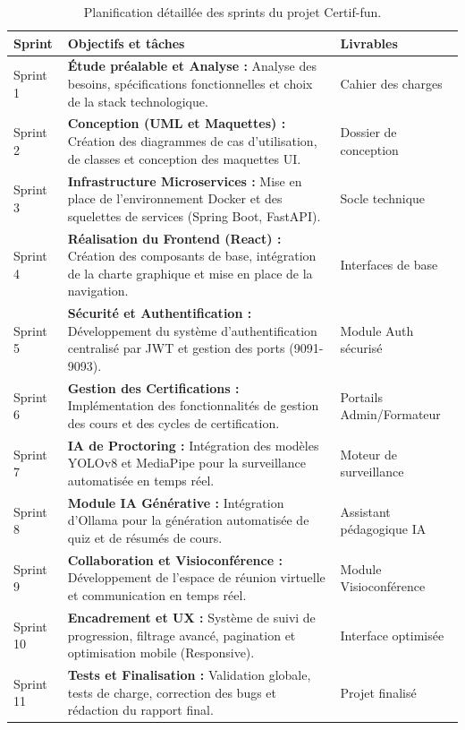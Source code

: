 \begin{table}[H]
\centering
\caption{Planification détaillée des sprints du projet Certif-fun.}
\label{table:sprints}
\begin{tabular}{|l|p{8cm}|l|}
\hline
\textbf{Sprint} & \textbf{Objectifs et tâches} & \textbf{Livrables} \\ \hline
Sprint 1 & \textbf{Étude préalable et Analyse :} Analyse des besoins, spécifications fonctionnelles et choix de la stack technologique. & Cahier des charges \\ \hline
Sprint 2 & \textbf{Conception (UML et Maquettes) :} Création des diagrammes de cas d'utilisation, de classes et conception des maquettes UI. & Dossier de conception \\ \hline
Sprint 3 & \textbf{Infrastructure Microservices :} Mise en place de l'environnement Docker et des squelettes de services (Spring Boot, FastAPI). & Socle technique \\ \hline
Sprint 4 & \textbf{Réalisation du Frontend (React) :} Création des composants de base, intégration de la charte graphique et mise en place de la navigation. & Interfaces de base \\ \hline
Sprint 5 & \textbf{Sécurité et Authentification :} Développement du système d'authentification centralisé par JWT et gestion des ports (9091-9093). & Module Auth sécurisé \\ \hline
Sprint 6 & \textbf{Gestion des Certifications :} Implémentation des fonctionnalités de gestion des cours et des cycles de certification. & Portails Admin/Formateur \\ \hline
Sprint 7 & \textbf{IA de Proctoring :} Intégration des modèles YOLOv8 et MediaPipe pour la surveillance automatisée en temps réel. & Moteur de surveillance \\ \hline
Sprint 8 & \textbf{Module IA Générative :} Intégration d'Ollama pour la génération automatisée de quiz et de résumés de cours. & Assistant pédagogique IA \\ \hline
Sprint 9 & \textbf{Collaboration et Visioconférence :} Développement de l'espace de réunion virtuelle et communication en temps réel. & Module Visioconférence \\ \hline
Sprint 10 & \textbf{Encadrement et UX :} Système de suivi de progression, filtrage avancé, pagination et optimisation mobile (Responsive). & Interface optimisée \\ \hline
Sprint 11 & \textbf{Tests et Finalisation :} Validation globale, tests de charge, correction des bugs et rédaction du rapport final. & Projet finalisé \\ \hline
\end{tabular}
\end{table}

